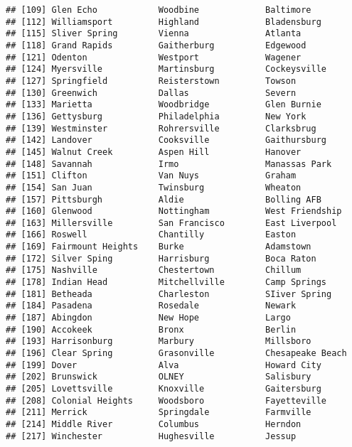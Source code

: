 \documentclass[]{article}
\begin{document}
\begin{verbatim}
## [109] Glen Echo            Woodbine             Baltimore           
## [112] Williamsport         Highland             Bladensburg         
## [115] Sliver Spring        Vienna               Atlanta             
## [118] Grand Rapids         Gaitherburg          Edgewood            
## [121] Odenton              Westport             Wagener             
## [124] Myersville           Martinsburg          Cockeysville        
## [127] Springfield          Reisterstown         Towson              
## [130] Greenwich            Dallas               Severn              
## [133] Marietta             Woodbridge           Glen Burnie         
## [136] Gettysburg           Philadelphia         New York            
## [139] Westminster          Rohrersville         Clarksbrug          
## [142] Landover             Cooksville           Gaithursburg        
## [145] Walnut Creek         Aspen Hill           Hanover             
## [148] Savannah             Irmo                 Manassas Park       
## [151] Clifton              Van Nuys             Graham              
## [154] San Juan             Twinsburg            Wheaton             
## [157] Pittsburgh           Aldie                Bolling AFB         
## [160] Glenwood             Nottingham           West Friendship     
## [163] Millersville         San Francisco        East Liverpool      
## [166] Roswell              Chantilly            Easton              
## [169] Fairmount Heights    Burke                Adamstown           
## [172] Silver Sping         Harrisburg           Boca Raton          
## [175] Nashville            Chestertown          Chillum             
## [178] Indian Head          Mitchellville        Camp Springs        
## [181] Betheada             Charleston           SIiver Spring       
## [184] Pasadena             Rosedale             Newark              
## [187] Abingdon             New Hope             Largo               
## [190] Accokeek             Bronx                Berlin              
## [193] Harrisonburg         Marbury              Millsboro           
## [196] Clear Spring         Grasonville          Chesapeake Beach    
## [199] Dover                Alva                 Howard City         
## [202] Brunswick            OLNEY                Salisbury           
## [205] Lovettsville         Knoxville            Gaitersburg         
## [208] Colonial Heights     Woodsboro            Fayetteville        
## [211] Merrick              Springdale           Farmville           
## [214] Middle River         Columbus             Herndon             
## [217] Winchester           Hughesville          Jessup              

\end{verbatim}
\end{document}
